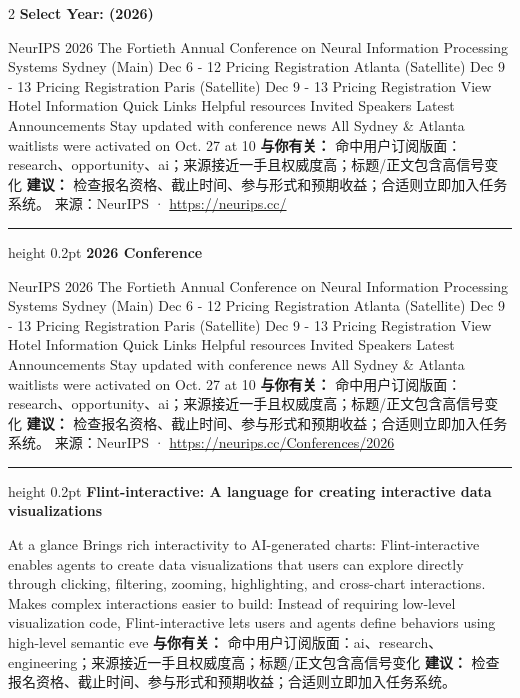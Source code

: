 \documentclass[10.5pt]{ctexart}
\begin{document}
\begin{multicols}{2}
{\large\bfseries Select Year: (2026)}\par
NeurIPS 2026 The Fortieth Annual Conference on Neural Information Processing Systems Sydney (Main) Dec 6 - 12 Pricing Registration Atlanta (Satellite) Dec 9 - 13 Pricing Registration Paris (Satellite) Dec 9 - 13 Pricing Registration View Hotel Information Quick Links Helpful resources Invited Speakers Latest Announcements Stay updated with conference news All Sydney \& Atlanta waitlists were activated on Oct. 27 at 10
\textbf{与你有关：} 命中用户订阅版面：research、opportunity、ai；来源接近一手且权威度高；标题/正文包含高信号变化
\textbf{建议：} 检查报名资格、截止时间、参与形式和预期收益；合适则立即加入任务系统。
{\footnotesize\color{ormuted} 来源：NeurIPS · \url{https://neurips.cc/}}
\vspace{2mm}
\hrule height 0.2pt
\vspace{2mm}
{\large\bfseries 2026 Conference}\par
NeurIPS 2026 The Fortieth Annual Conference on Neural Information Processing Systems Sydney (Main) Dec 6 - 12 Pricing Registration Atlanta (Satellite) Dec 9 - 13 Pricing Registration Paris (Satellite) Dec 9 - 13 Pricing Registration View Hotel Information Quick Links Helpful resources Invited Speakers Latest Announcements Stay updated with conference news All Sydney \& Atlanta waitlists were activated on Oct. 27 at 10
\textbf{与你有关：} 命中用户订阅版面：research、opportunity、ai；来源接近一手且权威度高；标题/正文包含高信号变化
\textbf{建议：} 检查报名资格、截止时间、参与形式和预期收益；合适则立即加入任务系统。
{\footnotesize\color{ormuted} 来源：NeurIPS · \url{https://neurips.cc/Conferences/2026}}
\vspace{2mm}
\hrule height 0.2pt
\vspace{2mm}
{\large\bfseries Flint-interactive: A language for creating interactive data visualizations}\par
At a glance Brings rich interactivity to AI-generated charts: Flint-interactive enables agents to create data visualizations that users can explore directly through clicking, filtering, zooming, highlighting, and cross-chart interactions. Makes complex interactions easier to build: Instead of requiring low-level visualization code, Flint-interactive lets users and agents define behaviors using high-level semantic eve
\textbf{与你有关：} 命中用户订阅版面：ai、research、engineering；来源接近一手且权威度高；标题/正文包含高信号变化
\textbf{建议：} 检查报名资格、截止时间、参与形式和预期收益；合适则立即加入任务系统。

\end{multicols}
\end{document}
